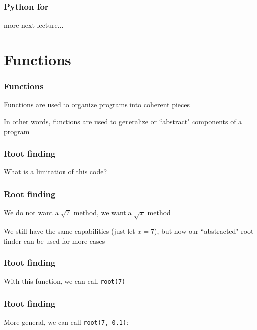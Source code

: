 \documentclass{beamer}
\begin{document}
\begin{frame}
\frametitle{Python for}


\vspace{0.5in}

more next lecture...

\end{frame}


\section{Functions}
\begin{frame}
\frametitle{Functions}
Functions are used to organize programs into coherent pieces

\vspace{0.2in}

In other words, functions are used to generalize or ``abstract" components of a program 
\end{frame}


\begin{frame}
\frametitle{Root finding}

What is a limitation of this code?



\end{frame}

\begin{frame}
\frametitle{Root finding}
We do not want a $\sqrt{7}$ method, we want a $\sqrt{x}$ method

\vspace{0.2in}

We still have the same capabilities (just let $x = 7$), but now our ``abstracted" root finder can be used for more cases
\end{frame}


\begin{frame}
\frametitle{Root finding}

With this function, we can call \texttt{root(7)}



\end{frame}

\begin{frame}
\frametitle{Root finding}
More general, we can call \texttt{root(7, 0.1)}:



\end{frame}
\end{document}
